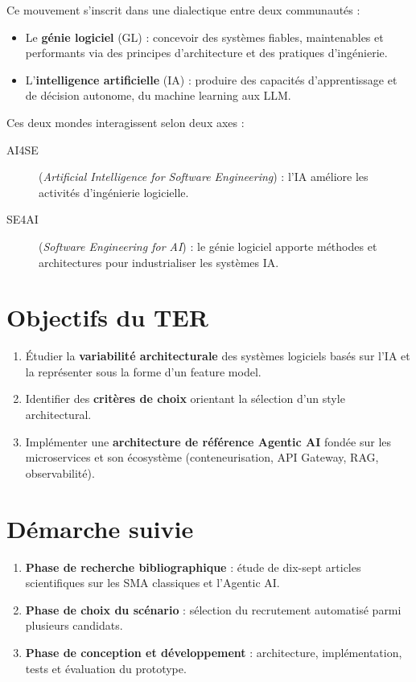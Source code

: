 \documentclass[12pt,a4paper]{report}
\begin{document}
Ce mouvement s'inscrit dans une dialectique entre deux communautés :

\begin{itemize}
  \item Le \textbf{génie logiciel} (GL) : concevoir des systèmes fiables, maintenables
        et performants via des principes d'architecture et des pratiques d'ingénierie.
  \item L'\textbf{intelligence artificielle} (IA) : produire des capacités
        d'apprentissage et de décision autonome, du machine learning aux LLM.
\end{itemize}

Ces deux mondes interagissent selon deux axes :

\begin{description}
  \item[AI4SE] (\textit{Artificial Intelligence for Software Engineering}) :
        l'IA améliore les activités d'ingénierie logicielle.
  \item[SE4AI] (\textit{Software Engineering for AI}) :
        le génie logiciel apporte méthodes et architectures pour industrialiser les
        systèmes IA.
\end{description}

\section{Objectifs du TER}

\begin{enumerate}
  \item Étudier la \textbf{variabilité architecturale} des systèmes logiciels basés
        sur l'IA et la représenter sous la forme d'un feature model.
  \item Identifier des \textbf{critères de choix} orientant la sélection d'un style
        architectural.
  \item Implémenter une \textbf{architecture de référence Agentic AI} fondée sur les
        microservices et son écosystème (conteneurisation, API Gateway, RAG,
        observabilité).
\end{enumerate}

\section{Démarche suivie}

\begin{enumerate}
  \item \textbf{Phase de recherche bibliographique} : étude de dix-sept articles
        scientifiques sur les SMA classiques et l'Agentic AI.
  \item \textbf{Phase de choix du scénario} : sélection du recrutement automatisé
        parmi plusieurs candidats.
  \item \textbf{Phase de conception et développement} : architecture, implémentation,
        tests et évaluation du prototype.
\end{enumerate}
\end{document}
